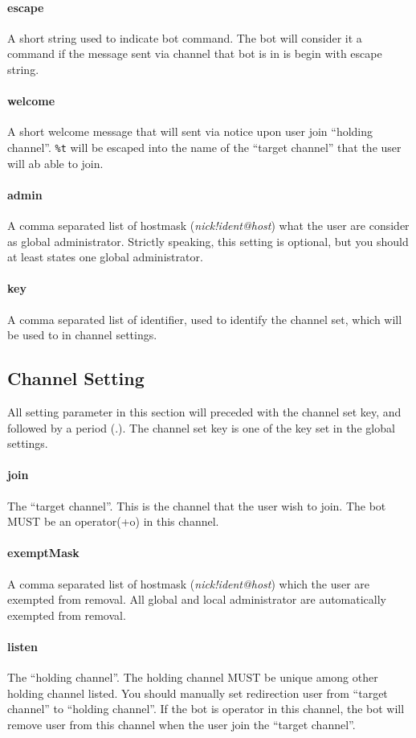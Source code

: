\documentclass[a4paper,12pt,titlepage]{article}
\begin{document}
\paragraph{escape} \label{sec:conf:escape}A short string used to indicate bot command. The bot will consider it a command if the message sent via channel that bot is in is begin with escape string.
\paragraph{welcome} A short welcome message that will sent via notice upon user join ``holding channel''. \texttt{\%t} will be escaped into the name of the ``target channel'' that the user will ab able to join.
\paragraph{admin} A comma separated list of hostmask (\textit{nick!ident@host}) what the user are consider as global administrator. Strictly speaking, this setting is optional, but you should at least states one global administrator.
\paragraph{key} A comma separated list of identifier, used to identify the channel set, which will be used to in channel settings. 
\subsection{Channel Setting}
All setting parameter in this section will preceded with the channel set key, and followed by a period (.). The channel set key is one of the key set in the global settings.
\paragraph{join} The ``target channel''. This is the channel that the user wish to join. The bot MUST be an operator(+o) in this channel.
\paragraph{exemptMask} A comma separated list of hostmask (\textit{nick!ident@host}) which the user are exempted from removal. All global and local administrator are automatically exempted from removal.
\paragraph{listen} The ``holding channel''. The holding channel MUST be unique among other holding channel listed. You should manually set redirection user from  ``target channel'' to ``holding channel''. If the bot is operator in this channel, the bot will remove user from this channel when the user join the ``target channel''.
\end{document}
